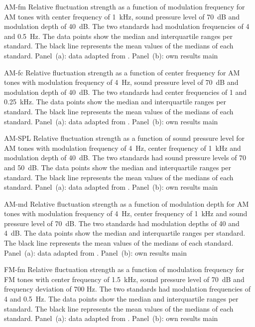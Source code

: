 \documentclass[../main.tex]{subfiles}
\begin{document}
\begin{experimentalresults}

\myfigurefastlexpstds%
  {AM-fm}
  {Relative fluctuation strength as a function of modulation frequency for
    \gls{AM} tones with center frequency of 1~kHz, sound pressure level of
    70~dB and modulation depth of 40~dB.  The two standards had modulation
    frequencies of 4 and 0.5~Hz. The data points show the median and
    interquartile ranges per standard. The black line represents the mean values
    of the medians of each standard. Panel~(a): data adapted from
    \cite[pp.248]{Fastl2007Psychoacoustics}. Panel~(b): own results}
  {main}

\myfigurefastlexpstds%
  {AM-fc}
  {Relative fluctuation strength as a function of center frequency for
    \gls{AM} tones with modulation frequency of 4~Hz, sound pressure level of
    70~dB and modulation depth of 40~dB.  The two standards had center
    frequencies of 1 and 0.25~kHz. The data points show the median and
    interquartile ranges per standard. The black line represents the mean values
    of the medians of each standard. Panel~(a): data adapted from
    \cite[pp.250]{Fastl2007Psychoacoustics}. Panel~(b): own results}
  {main}

\myfigurefastlexpstds%
  {AM-SPL}
  {Relative fluctuation strength as a function of sound pressure level for
    \gls{AM} tones with modulation frequency of 4~Hz, center frequency of 1~kHz
    and modulation depth of 40~dB.  The two standards had sound pressure levels
    of 70 and 50~dB. The data points show the median and
    interquartile ranges per standard. The black line represents the mean values
    of the medians of each standard. Panel~(a): data adapted from
    \cite[pp.249]{Fastl2007Psychoacoustics}. Panel~(b): own results}
  {main}

\myfigurefastlexpstds%
  {AM-md}
  {Relative fluctuation strength as a function of modulation depth for
    \gls{AM} tones with modulation frequency of 4~Hz, center frequency of 1~kHz
    and sound pressure level of 70~dB.  The two standards had modulation depths
    of 40 and 4~dB. The data points show the median and
    interquartile ranges per standard. The black line represents the mean values
    of the medians of each standard. Panel~(a): data adapted from
    \cite[pp.249]{Fastl2007Psychoacoustics}. Panel~(b): own results}
  {main}

\myfigurefastlexpstds%
  {FM-fm}
  {Relative fluctuation strength as a function of modulation frequency for
    \gls{FM} tones with center frequency of 1.5~kHz, sound pressure level of
    70~dB and frequency deviation of 700 Hz.  The two standards had modulation
    frequencies of 4 and 0.5~Hz. The data points show the median and
    interquartile ranges per standard. The black line represents the mean values
    of the medians of each standard. Panel~(a): data adapted from
    \cite[pp.248]{Fastl2007Psychoacoustics}. Panel~(b): own results}
  {main}


\end{experimentalresults}
\end{document}

